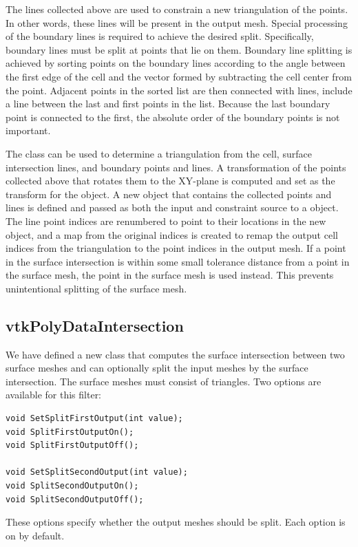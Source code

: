 \documentclass{InsightArticle}
\begin{document}
The lines collected above are used to constrain a new triangulation of the points. In other words, these lines will be present in the output mesh. Special processing of the boundary lines is required to achieve the desired split. Specifically, boundary lines must be split at points that lie on them. Boundary line splitting is achieved by sorting points on the boundary lines according to the angle between the first edge of the cell and the vector formed by subtracting the cell center from the point. Adjacent points in the sorted list are then connected with lines, include a line between the last and first points in the list. Because the last boundary point is connected to the first, the absolute order of the boundary points is not important.

The  class can be used to determine a triangulation from the cell, surface intersection lines, and boundary points and lines. A transformation of the points collected above that rotates them to the XY-plane is computed and set as the transform for the  object. A new  object that contains the collected points and lines is defined and passed as both the input and constraint source to a  object. The line point indices are renumbered to point to their locations in the new  object, and a map from the original indices is created to remap the output cell indices from the triangulation to the point indices in the output mesh. If a point in the surface intersection is within some small tolerance distance from a point in the surface mesh, the point in the surface mesh is used instead. This prevents unintentional splitting of the surface mesh.

\subsection{vtkPolyDataIntersection}

We have defined a new class  that computes the surface intersection between two surface meshes and can optionally split the input meshes by the surface intersection. The surface meshes must consist of triangles. Two options are available for this filter:
\begin{verbatim}
void SetSplitFirstOutput(int value);
void SplitFirstOutputOn();
void SplitFirstOutputOff();

void SetSplitSecondOutput(int value);
void SplitSecondOutputOn();
void SplitSecondOutputOff();
\end{verbatim}
These options specify whether the output meshes should be split. Each option is on by default.
\end{document}
